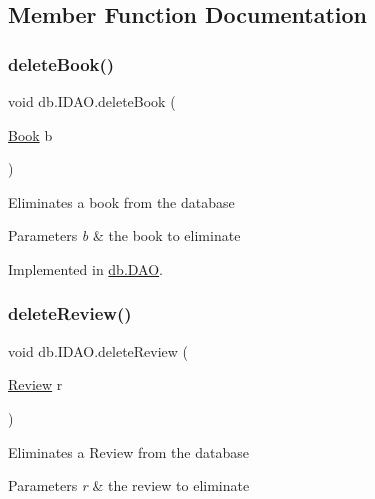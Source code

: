 \subsection{Member Function Documentation}
\mbox{\label{interfacedb_1_1_i_d_a_o_a1d6c98ea794177d7fd12c4a028ec29c1}} 
\subsubsection{\texorpdfstring{delete\+Book()}{deleteBook()}}
{\footnotesize\ttfamily void db.\+I\+D\+A\+O.\+delete\+Book (\begin{DoxyParamCaption}\item[{\hyperlink{classserver_1_1data_1_1_book}{Book}}]{b }\end{DoxyParamCaption})}

Eliminates a book from the database 
\begin{DoxyParams}{Parameters}
{\em b} & the book to eliminate \\
\hline
\end{DoxyParams}


Implemented in \hyperlink{classdb_1_1_d_a_o_a65f6a816c5f6dfb07178daf490f56fdc}{db.\+D\+AO}.

\mbox{\label{interfacedb_1_1_i_d_a_o_a78ca80bc2f2b660edeb9eddd8ca9a4b7}} 
\subsubsection{\texorpdfstring{delete\+Review()}{deleteReview()}}
{\footnotesize\ttfamily void db.\+I\+D\+A\+O.\+delete\+Review (\begin{DoxyParamCaption}\item[{\hyperlink{classserver_1_1data_1_1_review}{Review}}]{r }\end{DoxyParamCaption})}

Eliminates a Review from the database 
\begin{DoxyParams}{Parameters}
{\em r} & the review to eliminate \\
\hline
\end{DoxyParams}


